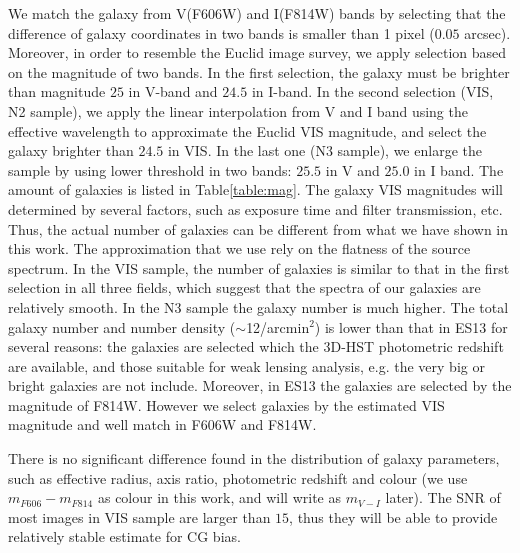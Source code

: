 \documentclass[useAMS,usenatbib]{mn2e}
\begin{document}
We match the galaxy from V(F606W) and I(F814W) bands by selecting that
the difference of galaxy coordinates in two bands is smaller than 1
pixel ($0.05$ arcsec). Moreover, in order to resemble the Euclid image
survey, we apply selection based on the magnitude of two bands. In the
first selection, the galaxy must be brighter than magnitude $25$ in
V-band and $24.5$ in I-band. In the second selection (VIS, N2 sample),
we apply the linear interpolation from V and I band using the
effective wavelength to approximate the Euclid VIS magnitude, and
select the galaxy brighter than $24.5$ in VIS. In the last one (N3
sample), we enlarge the sample by using lower threshold in two bands:
$25.5$ in V and $25.0$ in I band. The amount of galaxies is listed in
Table\ref{table:mag}.
%
The galaxy VIS magnitudes will determined by several factors, such as
exposure time and filter transmission, etc. Thus, the actual number of
galaxies can be different from what we have shown in this work. The
approximation that we use rely on the flatness of the source
spectrum. In the VIS sample, the number of galaxies is similar to that in
the first selection in all three fields, which suggest that the
spectra of our galaxies are relatively smooth. In the N3 sample the galaxy
number is much higher.
%
The total galaxy number and number density ($\sim$12/arcmin$^2$) is
lower than that in ES13 for several reasons: the galaxies are selected
which the 3D-HST photometric redshift are available, and those
suitable for weak lensing analysis, e.g. the very big or bright
galaxies are not include. Moreover, in ES13 the galaxies are selected
by the magnitude of F814W. However we select galaxies by the estimated
VIS magnitude and well match in F606W and F814W.

There is no significant difference found in the distribution of galaxy
parameters, such as effective radius, axis ratio, photometric redshift
and colour (we use $m_{F606}-m_{F814}$ as colour in this work, and
will write as $m_{V-I}$ later). The SNR of most images in VIS sample
are larger than $15$, thus they will be able to provide relatively
stable estimate for CG bias.
\end{document}
